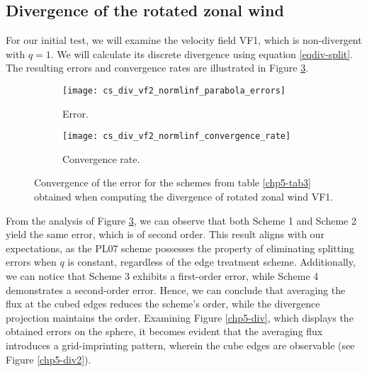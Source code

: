 \subsection{Divergence of the rotated zonal wind}
For our initial test, we will examine the velocity field VF1, which is non-divergent with $q=1$.
We will calculate its discrete divergence using equation \eqref{eqdiv-split}.
The resulting errors and convergence rates are illustrated in Figure \ref{chp5-error-div}.
\begin{figure}[!htb]
	\centering
	\begin{subfigure}{0.42\textwidth}
		\centering
		\texttt{[image: cs\_div\_vf2\_normlinf\_parabola\_errors]}
		\caption{Error.\label{chp5-errordiv}}
	\end{subfigure}
	\begin{subfigure}{0.42\textwidth}
		\centering
		\texttt{[image: cs\_div\_vf2\_normlinf\_convergence\_rate]}
		\caption{Convergence rate.\label{chp5-crdiv}}
	\end{subfigure}
	\caption{Convergence of the error for the schemes from table \ref{chp5-tab3} obtained when computing the divergence of rotated zonal wind VF1.
		\label{chp5-error-div}}
\end{figure}
From the analysis of Figure \ref{chp5-error-div}, we can observe that both Scheme 1 and Scheme 2 yield the same error,
which is of second order. This result aligns with our expectations, as the PL07 scheme possesses the property of eliminating
splitting errors when $q$ is constant, regardless of the edge treatment scheme.
Additionally, we can notice that Scheme 3 exhibits a first-order error, while Scheme 4 demonstrates a second-order error.
Hence, we can conclude that averaging the flux at the cubed edges reduces the scheme's order, while the divergence projection maintains the order.
Examining Figure \ref{chp5-div}, which displays the obtained errors on the sphere, it becomes evident that the averaging
flux introduces a grid-imprinting pattern, wherein the cube edges are observable (see Figure \ref{chp5-div2}).
